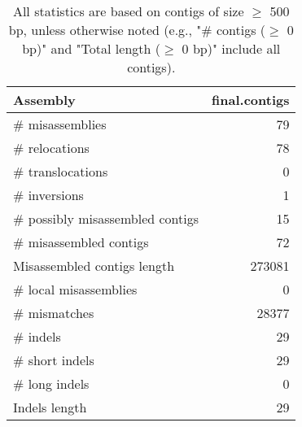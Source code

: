 \documentclass[12pt,a4paper]{article}
\begin{document}
\begin{table}[ht]
\begin{center}
\caption{All statistics are based on contigs of size $\geq$ 500 bp, unless otherwise noted (e.g., "\# contigs ($\geq$ 0 bp)" and "Total length ($\geq$ 0 bp)" include all contigs).}
\begin{tabular}{|l*{1}{|r}|}
\hline
Assembly & final.contigs \\ \hline
\# misassemblies & 79 \\ \hline
\hspace{5mm}\# relocations & 78 \\ \hline
\hspace{5mm}\# translocations & 0 \\ \hline
\hspace{5mm}\# inversions & 1 \\ \hline
\# possibly misassembled contigs & 15 \\ \hline
\# misassembled contigs & 72 \\ \hline
Misassembled contigs length & 273081 \\ \hline
\# local misassemblies & 0 \\ \hline
\# mismatches & 28377 \\ \hline
\# indels & 29 \\ \hline
\hspace{5mm}\# short indels & 29 \\ \hline
\hspace{5mm}\# long indels & 0 \\ \hline
Indels length & 29 \\ \hline
\end{tabular}
\end{center}
\end{table}
\end{document}
